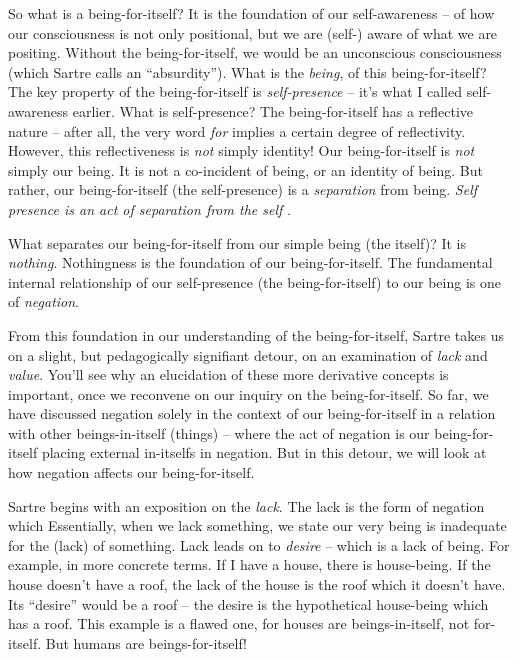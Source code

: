So what is a being-for-itself? It is the foundation of our self-awareness -- of how our consciousness is not only positional, but we are (self-) aware of what we are positing. Without the being-for-itself, we would be an unconscious consciousness (which Sartre calls an \enquote{absurdity}). What is the \emph{being}, of this being-for-itself? The key property of the being-for-itself is \emph{self-presence} -- it's what I called self-awareness earlier. What is self-presence? The being-for-itself has a reflective nature -- after all, the very word \emph{for} implies a certain degree of reflectivity. However, this reflectiveness is \emph{not} simply identity! Our being-for-itself is \emph{not} simply our being. It is not a co-incident of being, or an identity of being. But rather, our being-for-itself (the self-presence) is a \emph{separation} from being. \emph{Self presence is an act of separation from the self} \autocite[127]{sartre}.

What separates our being-for-itself from our simple being (the itself)? It is \emph{nothing}. Nothingness is the foundation of our being-for-itself. The fundamental internal relationship of our self-presence (the being-for-itself) to our being is one of \emph{negation}. 

From this foundation in our understanding of the being-for-itself, Sartre takes us on a slight, but pedagogically signifiant detour, on an examination of \emph{lack} and \emph{value}. You'll see why an elucidation of these more derivative concepts is important, once we reconvene on our inquiry on the being-for-itself. So far, we have discussed negation solely in the context of our being-for-itself in a relation with other beings-in-itself (things) -- where the act of negation is our being-for-itself placing external in-itselfs in negation. But in this detour, we will look at how negation affects our being-for-itself.

Sartre begins with an exposition on the \emph{lack}. The lack is the form of negation which  Essentially, when we lack something, we state our very being is inadequate for the (lack) of something. Lack leads on to \emph{desire} -- which is a lack of being. For example, in more concrete terms. If I have a house, there is house-being. If the house doesn't have a roof, the lack of the house is the roof which it doesn't have. Its \enquote{desire} would be a roof -- the desire is the hypothetical house-being which has a roof. This example is a flawed one, for houses are beings-in-itself, not for-itself. But humans are beings-for-itself!

